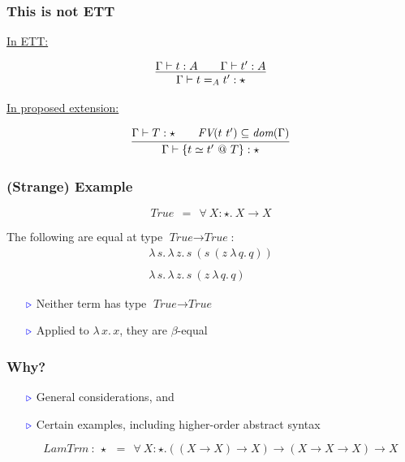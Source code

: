 \documentclass[11pt]{beamer}
\newcommand{\myb}[0]{\ensuremath{\textcolor{blue}{\triangleright}}}
\begin{document}
\begin{frame}
  \frametitle{This is not ETT}

  \underline{In ETT:}

  \[
  \infer{\Gamma\vdash t =_A t' : \star}{\Gamma\vdash t : A \qquad \Gamma\vdash t' : A}
  \]

\vspace{1cm}

  \underline{In proposed extension:}
  
  \[
  \infer{\Gamma\vdash \{ t \simeq t'\ @\ T \} : \star}{\Gamma\vdash T: \star \qquad \textit{FV}(t\ t')\subseteq\textit{dom}(\Gamma)}
  \]

  \end{frame}

\begin{frame}
  \frametitle{(Strange) Example}

  \[
  \textit{True}\ \ =\ \ \forall\ X:\star.\ X \to X
  \]

  The following are equal at type $\textit{True}\to\textit{True}$:
  \[
  \begin{array}{l}
    \lambda\,s.\,\lambda\,z.\, s\ (s\ (z\ \lambda\, q.\,q))\\ \\
    \lambda\,s.\,\lambda\,z.\, s\ (z\ \lambda\, q.\,q)
  \end{array}
  \]

  \begin{itemize}
  \item[$\myb$] Neither term has type $\textit{True}\to\textit{True}$
  \item[$\myb$] Applied to $\lambda\,x.\,x$, they are $\beta$-equal
  \end{itemize}
\end{frame}

\begin{frame}
  \frametitle{Why?}

  \begin{itemize}
  \item[$\myb$] General considerations, and

\vspace{1cm}

  \item[$\myb$] Certain examples, including higher-order abstract syntax

    \[
    \textit{LamTrm}\ : \ \star \ \ = \ \ \forall\ X:\star.((X \to X) \to X) \to (X \to X \to X) \to X
    \]
    \end{itemize}
\end{frame}
\end{document}
